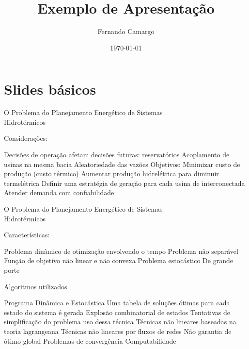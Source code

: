 \documentclass{beamer}
\title{Exemplo de Apresentação}
\date{\today}
\author{Fernando Camargo}
\institute{ZG Soluções}
\begin{document}
  \maketitle
  
  \section{Slides básicos}
  
  \begin{frame}{O Problema do Planejamento Energético de Sistemas\\Hidrotérmicos}
    
    Considerações:
    \begin{outline}
       Decisões de operação afetam decisões futuras: reservatórios
       Acoplamento de usinas na mesma bacia
       Aleatoriedade das vazões
       Objetivos:
	\2<4-> Minimizar custo de produção (custo térmico)
	\2<5-> Aumentar produção hidrelétrica para diminuir termelétrica
	\2<6-> Definir uma estratégia de geração para cada usina de interconectada
	\2<7-> Atender demanda com confiabilidade
    \end{outline}
  \end{frame}
  
  \begin{frame}{O Problema do Planejamento Energético de Sistemas\\Hidrotérmicos}
    
    Características:
    \begin{outline}
       Problema dinâmico de otimização envolvendo o tempo
       Problema não separável
       Função de objetivo não linear e não convexa
       Problema estocástico
       De grande porte
    \end{outline}
  \end{frame}
  
  \begin{frame}{Algoritmos utilizados}
    
    \begin{outline}
    \0 
       Programa Dinâmica e Estocástica
	\2 Uma tabela de soluções ótimas para cada estado do sistema é gerada
	\2 Explosão combinatorial de estados
	\2 Tentativas de simplificação do problema uso dessa técnica
       Técnicas não lineares baseadas na teoria lagrangeana
       Técnicas não lineares por fluxos de redes
    \0 
       Não garantia de ótimo global
       Problemas de convergência 
       Computabilidade
    \end{outline}
  \end{frame}
  
\end{document}
